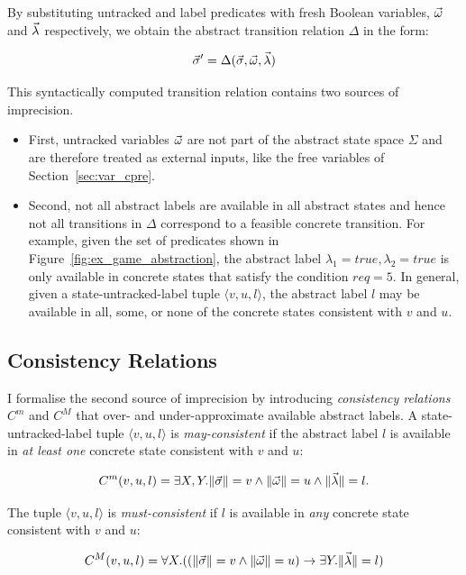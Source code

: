 By substituting untracked and label predicates with fresh Boolean variables, $\vec{\omega}$ and $\vec{\lambda}$ respectively, we obtain the abstract transition relation $\Delta$ in the form:

$$
\vec{\sigma}'=\Delta(\vec{\sigma},\vec{\omega},\vec{\lambda})
$$

This syntactically computed transition relation contains two sources of imprecision.  

\begin{itemize}
    \item First, untracked variables $\vec{\omega}$ are not part of the abstract state space $\Sigma$ and are therefore treated as external inputs, like the free variables of Section~\ref{sec:var_cpre}.
    \item Second, not all abstract labels  are available in all abstract states and hence not all transitions in $\Delta$ correspond to a feasible concrete transition.  For example, given the set of predicates shown in Figure~\ref{fig:ex_game_abstraction}, the abstract label $\lambda_1 = true, \lambda_2 = true$ is only available in concrete states that satisfy the condition $req=5$.  In general, given a state-untracked-label tuple $\langle v,u,l\rangle$, the abstract label $l$ may be available in all, some, or none of the concrete states consistent with $v$ and $u$.  
\end{itemize}

\subsection{Consistency Relations}

I formalise the second source of imprecision by introducing \emph{consistency relations} $C^m$ and $C^M$ that over- and under-approximate available abstract labels.  A state-untracked-label tuple $\langle v,u,l\rangle$ is \emph{may-consistent} if the abstract label $l$ is available in \emph{at least one} concrete state consistent with $v$ and $u$:

\begin{equation} 
    \label{eqn:cm}
    C^m(v,u,l) = \exists X,Y. \|\vec{\sigma}\|=v \land \|\vec{\omega}\|=u \land \|\vec{\lambda}\|=l.
\end{equation}

The tuple $\langle v,u,l\rangle$ is \emph{must-consistent} if $l$ is available in \emph{any} concrete state consistent with $v$ and $u$:

\begin{equation}
    \label{eqn:cM}
    C^M(v,u,l) = \forall X . ((\|\vec{\sigma}\|=v \land \|\vec{\omega}\|=u) \rightarrow \exists Y.  \|\vec{\lambda}\|=l)
\end{equation}


